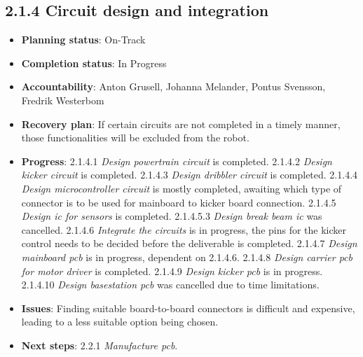 
\subsection*{2.1.4 Circuit design and integration}
\begin{itemize}
    \item \textbf{Planning status}: On-Track
    \item \textbf{Completion status}: In Progress
    \item \textbf{Accountability}: Anton Grusell, Johanna Melander, Pontus Svensson, Fredrik Westerbom
    \item \textbf{Recovery plan}: If certain circuits are not completed in a timely manner, those functionalities will be excluded from the robot.
    \item \textbf{Progress}: 2.1.4.1 \textit{Design powertrain circuit} is completed. 2.1.4.2 \textit{Design kicker circuit} is completed. 2.1.4.3 \textit{Design dribbler circuit} is completed. 2.1.4.4 \textit{Design microcontroller circuit} is mostly completed, awaiting which type of connector is to be used for mainboard to kicker board connection. 2.1.4.5 \textit{Design \acs{ic} for sensors} is completed. 2.1.4.5.3 \textit{Design break beam \acs{ic}} was cancelled. 2.1.4.6 \textit{Integrate the circuits} is in progress, the pins for the kicker control needs to be decided before the deliverable is completed. 2.1.4.7 \textit{Design mainboard \acs{pcb}} is in progress, dependent on 2.1.4.6. 2.1.4.8 \textit{Design carrier \acs{pcb} for motor driver} is completed. 2.1.4.9 \textit{Design kicker \acs{pcb}} is in progress. 2.1.4.10 \textit{Design basestation \acs{pcb}} was cancelled due to time limitations.
    \item \textbf{Issues}: Finding suitable board-to-board connectors is difficult and expensive, leading to a less suitable option being chosen.
    \item \textbf{Next steps}: 2.2.1 \textit{Manufacture \acs{pcb}}.
\end{itemize}


